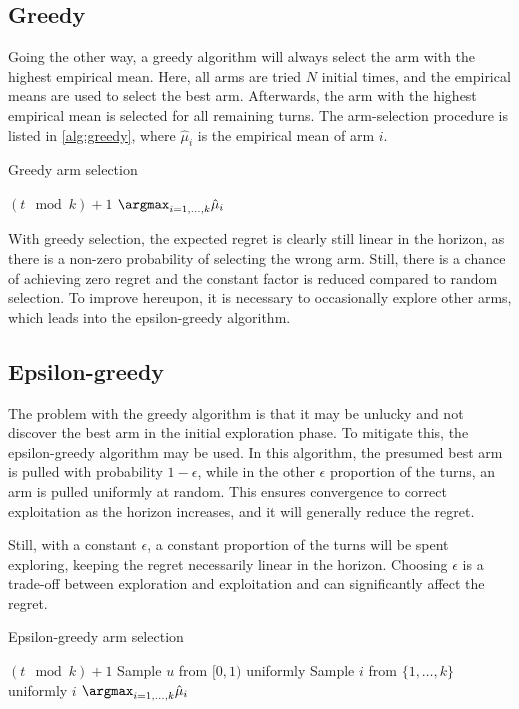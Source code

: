\subsection{Greedy}
Going the other way, a greedy algorithm will always select the arm with the highest empirical mean.
Here, all arms are tried $N$ initial times, and the empirical means are used to select the best arm.
Afterwards, the arm with the highest empirical mean is selected for all remaining turns.
The arm-selection procedure is listed in \cref{alg:greedy}, where $\hat{\mu}_i$ is the empirical mean of arm $i$.
\begin{algorithm}
    \caption{Greedy arm selection}
    \label{alg:greedy}
    \begin{algorithmic}
        \State \Return $(t \mod k) + 1$
        \Else
        \State \Return $\argmax_{i=1,\dots,k} \hat{\mu}_i$
        \EndIf
    \end{algorithmic}
\end{algorithm}

With greedy selection, the expected regret is clearly still linear in the horizon, as there is a non-zero probability of selecting the wrong arm.
Still, there is a chance of achieving zero regret and the constant factor is reduced compared to random selection.
To improve hereupon, it is necessary to occasionally explore other arms, which leads into the epsilon-greedy algorithm.


\subsection{Epsilon-greedy}
The problem with the greedy algorithm is that it may be unlucky and not discover the best arm in the initial exploration phase.
To mitigate this, the epsilon-greedy algorithm may be used.
In this algorithm, the presumed best arm is pulled with probability $1-\epsilon$, while in the other $\epsilon$ proportion of the turns, an arm is pulled uniformly at random.
This ensures convergence to correct exploitation as the horizon increases, and it will generally reduce the regret.

Still, with a constant $\epsilon$, a constant proportion of the turns will be spent exploring, keeping the regret necessarily linear in the horizon.
Choosing $\epsilon$ is a trade-off between exploration and exploitation and can significantly affect the regret.

\begin{algorithm}
    \caption{Epsilon-greedy arm selection}
    \label{alg:eps_greedy}
    \begin{algorithmic}
        \State \Return $(t \mod k) + 1$
        \Else
        \State Sample $u$ from $[0,1)$ uniformly
        \State Sample $i$ from $\{1,\dots, k\}$ uniformly
        \State \Return $i$
        \Else
        \State \Return $\argmax_{i=1,\dots,k} \hat{\mu}_i$
        \EndIf
        \EndIf
    \end{algorithmic}
\end{algorithm}



